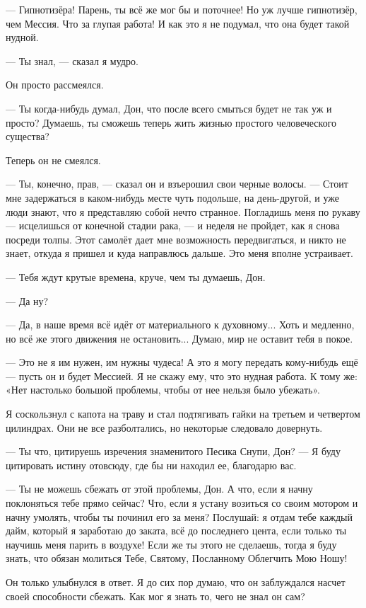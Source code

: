 --- Гипнотизёра! Парень, ты всё же мог бы и поточнее! Но уж лучше гипнотизёр, чем Мессия. Что за глупая работа! И как это я не подумал, что она будет такой нудной.

--- Ты знал, --- сказал я мудро.

Он просто рассмеялся.

--- Ты когда-нибудь думал, Дон, что после всего смыться будет не так уж и просто? Думаешь, ты сможешь теперь жить жизнью простого человеческого существа?

Теперь он не смеялся.

--- Ты, конечно, прав, --- сказал он и взъерошил свои черные волосы. --- Стоит мне задержаться в каком-нибудь месте чуть подольше, на день-другой, и уже люди знают, что я представляю собой нечто странное. Погладишь меня по рукаву --- исцелишься от конечной стадии рака, --- и неделя не пройдет, как я снова посреди толпы. Этот самолёт дает мне возможность передвигаться, и никто не знает, откуда я пришел и куда направлюсь дальше. Это меня вполне устраивает.

--- Тебя ждут крутые времена, круче, чем ты думаешь, Дон.

--- Да ну?

--- Да, в наше время всё идёт от материального к духовному... Хоть и медленно, но всё же этого
движения не остановить... Думаю, мир не оставит тебя в покое.

--- Это не я им нужен, им нужны чудеса! А это я могу передать кому-нибудь ещё --- пусть он и будет Мессией. Я не скажу ему, что это нудная работа. К тому же: «Нет настолько большой проблемы, чтобы от нее нельзя было убежать».

Я соскользнул с капота на траву и стал подтягивать гайки на третьем и четвертом цилиндрах. Они не все разболтались, но некоторые следовало довернуть.

--- Ты что, цитируешь изречения знаменитого Песика Снупи, Дон?
--- Я буду цитировать истину отовсюду, где бы ни находил ее, благодарю вас.

--- Ты не можешь сбежать от этой проблемы, Дон. А что, если я начну поклоняться тебе прямо сейчас?
Что, если я устану возиться со своим мотором и начну умолять, чтобы ты починил его за меня?
Послушай: я отдам тебе каждый дайм, который я заработаю до заката, всё до последнего цента, если
только ты научишь меня парить в воздухе! Если же ты этого не сделаешь, тогда я буду знать, что
обязан молиться Тебе, Святому, Посланному Облегчить Мою Ношу!

Он только улыбнулся в ответ. Я до сих пор думаю, что он заблуждался насчет своей способности сбежать. Как мог я знать то, чего не знал он сам?


